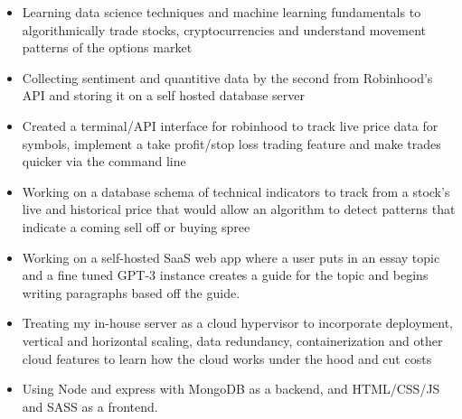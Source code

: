 \documentclass[10pt,a4paper,ragged2e]{altacv}
\begin{document}

\begin{fullwidth}
\makecvheader
\end{fullwidth}


\begin{itemize}
\item Learning data science techniques and machine learning fundamentals to algorithmically trade stocks, cryptocurrencies and understand movement patterns of the options market
\smallskip
\item Collecting sentiment and quantitive data by the second from Robinhood's API and storing it on a self hosted database server
\smallskip
\item Created a terminal/API interface for robinhood to track live price data for symbols, implement a take profit/stop loss trading feature and make trades quicker via the command line 
\smallskip
\item Working on a database schema of technical indicators to track from a stock's live and historical price that would allow an algorithm to detect patterns that indicate a coming sell off or buying spree
\end{itemize}
\smallskip
\smallskip
{}
\begin{itemize}
\item Working on a self-hosted SaaS web app where a user puts in an essay topic and a fine tuned GPT-3 instance creates a guide for the topic and begins writing paragraphs based off the guide. 
\smallskip
\item Treating my in-house server as a cloud hypervisor to incorporate deployment, vertical and horizontal scaling, data redundancy, containerization and other cloud features to learn how the cloud works under the hood and cut costs
\smallskip
\item Using Node and express with MongoDB as a backend, and HTML/CSS/JS and SASS as a frontend. 
\end{itemize}
\end{document}
